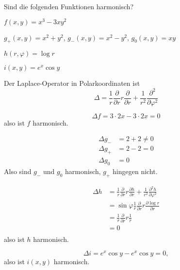 Sind die folgenden Funktionen harmonisch?
\begin{teilaufgaben}
\item $f(x,y)=x^3-3xy^2$
\item $g_+(x,y)=x^2+y^2$, $g_-(x,y)=x^2-y^2$, $g_0(x,y)=xy$
\item $h(r,\varphi)=\log r$
\item $i(x,y)=e^x\cos y$
\end{teilaufgaben}

\begin{hinweis}
Der Laplace-Operator in Polarkoordinaten ist
\[
\Delta =
\frac1r\frac{\partial}{\partial r}r\frac{\partial}{\partial r}
+
\frac1{r^2}\frac{\partial^2}{\partial\varphi^2}
\]
\end{hinweis}

\begin{loesung}
\begin{teilaufgaben}
\item
\[
\Delta f
=
3\cdot 2x-3\cdot 2x=0
\]
also ist $f$ harmonisch.
\item
\begin{align*}
\Delta g_-
&=
2+2\ne 0
\\
\Delta g_+
&=
2-2=0
\\
\Delta g_0
&=
0
\end{align*}
Also sind $g_-$ und $g_0$ harmonisch, $g_+$ hingegen nicht.
\item
\begin{align*}
\Delta h&=
\frac1r\frac{\partial}{\partial r}r\frac{\partial h}{\partial r}
+
\frac1{r^2}\frac{\partial^2 h}{\partial\varphi^2}
\\
&=
\sin\varphi\frac1r\frac{\partial}{\partial r}r\frac{\partial \log r}{\partial r}
\\
&=
\frac1r\frac{\partial}{\partial r}r\frac1r
\\
&=0
\\
\end{align*}
also ist $h$ harmonisch.
\item
\[
\Delta i=e^x\cos y-e^x\cos y=0,
\]
also ist $i(x,y)$ harmonisch.
\end{teilaufgaben}
\end{loesung}
